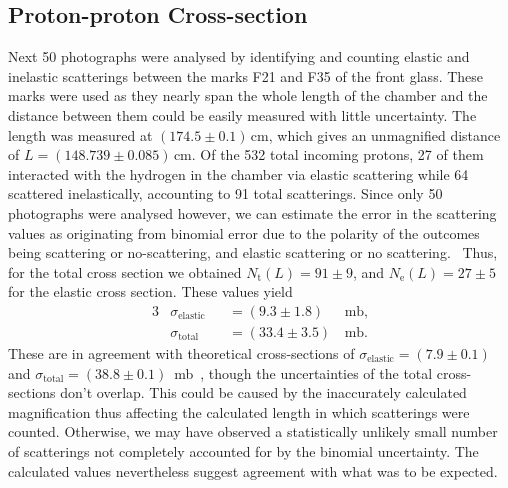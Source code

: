 \documentclass[twocolumn]{article}
\begin{document}
\subsection{Proton-proton Cross-section}
Next 50 photographs were analysed by identifying and counting elastic and inelastic scatterings between the marks F21 and F35 of the front glass. These marks were used as they nearly span the whole length of the chamber and the distance between them could be easily measured with little uncertainty. The length was measured at $(174.5 \pm 0.1)\,$cm, which gives an unmagnified distance of $L=(148.739 \pm 0.085)\,$cm. Of the 532 total incoming protons, 27 of them interacted with the hydrogen in the chamber via elastic scattering while 64 scattered inelastically, accounting to 91 total scatterings. Since only 50 photographs were analysed however, we can estimate the error in the scattering values as originating from binomial error due to the polarity of the outcomes being scattering or no-scattering, and elastic scattering or no scattering.~\cite{leo} Thus, for the total cross section we obtained %
$N_{\text{t}}(L) = 91 \pm 9$, and $N_{\text{e}}(L) = 27 \pm 5$ for the elastic cross section. These values yield
\begin{alignat*}{3}
&\sigma_{\text{elastic}} &&= (9.3 \pm 1.8) \, &\text{mb,}\\
&\sigma_{\text{total}} &&= (33.4 \pm 3.5) \, &\text{mb.} 
\end{alignat*}
These are in agreement with theoretical cross-sections of $\sigma_{\text{elastic}} = (7.9 \pm 0.1)$ and $ \sigma_{\text{total}} = (38.8 \pm 0.1) $~mb~\cite{seul}, though the uncertainties of the total cross-sections don't overlap. This could be caused by the inaccurately calculated magnification thus affecting the calculated length in which scatterings were counted. Otherwise, we may have observed a statistically unlikely small number of scatterings not completely accounted for by the binomial uncertainty. The calculated values nevertheless suggest agreement with what was to be expected.
\end{document}
